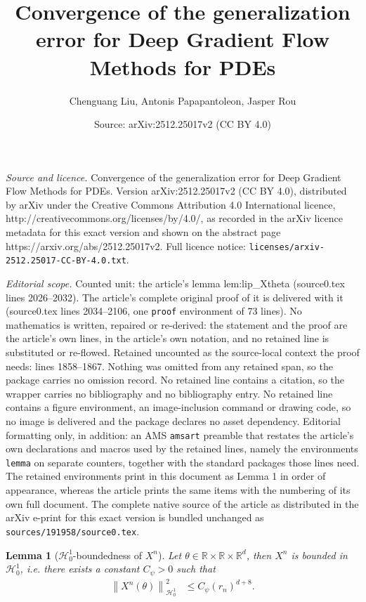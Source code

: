 \documentclass[10pt,a4paper]{amsart}
\title{Convergence of the generalization error for Deep Gradient Flow Methods for PDE\MakeLowercase{s}}
\author{Chenguang Liu, Antonis Papapantoleon, Jasper Rou}
\date{Source: arXiv:2512.25017v2 (CC BY 4.0)}
\newtheorem{lemma}{Lemma}
\newcommand{\R}{\mathbb{R}}
\newcommand{\abs}[1]{\left|#1\right|} %
\newcommand{\cH}{\mathcal{H}}
\newcommand{\norm}[1]{\left\|#1 \right\|} %
\def\red{\color{red}}
\begin{document}
\maketitle

\noindent\emph{Source and licence.} Convergence of the generalization error for Deep Gradient Flow Methods for PDE\MakeLowercase{s}. Version arXiv:2512.25017v2 (CC BY 4.0), distributed by arXiv under the Creative Commons Attribution 4.0 International licence, http://creativecommons.org/licenses/by/4.0/, as recorded in the arXiv licence metadata for this exact version and shown on the abstract page https://arxiv.org/abs/2512.25017v2. Full licence notice: \texttt{licenses/arxiv-2512.25017-CC-BY-4.0.txt}.\par\smallskip

\noindent\textit{Editorial scope.} Counted unit: the article's lemma lem:lip\_Xtheta (source0.tex lines 2026--2032). The article's complete original proof of it is delivered with it (source0.tex lines 2034--2106, one \texttt{proof} environment of 73 lines). No mathematics is written, repaired or re-derived: the statement and the proof are the article's own lines, in the article's own notation, and no retained line is substituted or re-flowed.  Retained uncounted as the source-local context the proof needs: lines 1858--1867.  Nothing was omitted from any retained span, so the package carries no omission record.  No retained line contains a citation, so the wrapper carries no bibliography and no bibliography entry.  No retained line contains a figure environment, an image-inclusion command or drawing code, so no image is delivered and the package declares no asset dependency.  Editorial formatting only, in addition: an AMS \texttt{amsart} preamble that restates the article's own declarations and macros used by the retained lines, namely the environments \texttt{lemma} on separate counters, together with the standard packages those lines need.  The retained environments print in this document as Lemma 1 in order of appearance, whereas the article prints the same items with the numbering of its own full document.  The complete native source of the article as distributed in the arXiv e-print for this exact version is bundled unchanged as \texttt{sources/191958/source0.tex}.
\begin{lemma}[$\cH_0^1$-boundedness of $X^n$]
\label{lem:boundXN}
Let $\theta \in \R \times \R \times \R^d$, then $X^n$ is bounded in $\cH_0^1$, \emph{i.e.} there exists a constant $C_\psi>0$ such that
\begin{align*}
\norm{X^n(\theta)}^2_{\cH_0^1} &\le C_\psi \left(r_n\right)^{d+8}.
\end{align*}
\end{lemma}
\end{document}
